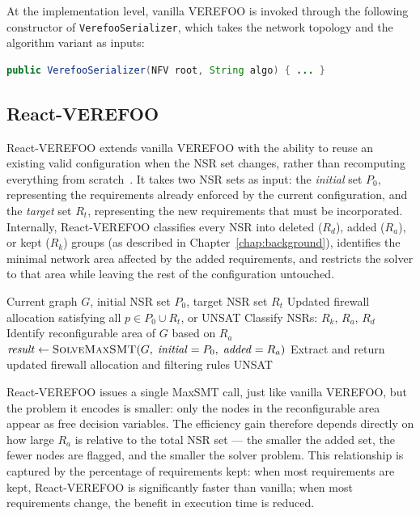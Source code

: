 At the implementation level, vanilla VEREFOO is invoked through the following constructor of \texttt{VerefooSerializer}, which takes the network topology and the algorithm variant as inputs:

\begin{lstlisting}[language=Java, caption={Vanilla VEREFOO constructor.}, label={lst:vanilla-constructor}]
public VerefooSerializer(NFV root, String algo) { ... }
\end{lstlisting}

\subsection{React-VEREFOO}

React-VEREFOO extends vanilla VEREFOO with the ability to reuse an existing valid configuration when the NSR set changes, rather than recomputing everything from scratch~\cite{reactverefoo}. It takes two NSR sets as input: the \textit{initial} set $P_0$, representing the requirements already enforced by the current configuration, and the \textit{target} set $R_t$, representing the new requirements that must be incorporated. Internally, React-VEREFOO classifies every NSR into deleted ($R_d$), added ($R_a$), or kept ($R_k$) groups (as described in Chapter~\ref{chap:background}), identifies the minimal network area affected by the added requirements, and restricts the solver to that area while leaving the rest of the configuration untouched.

\begin{algorithm}[H]
\caption{React-VEREFOO}
\label{alg:react}
\begin{algorithmic}[1]
\Require Current graph $G$, initial NSR set $P_0$, target NSR set $R_t$
\Ensure Updated firewall allocation satisfying all $p \in P_0 \cup R_t$, or UNSAT
\State Classify NSRs: $R_k$, $R_a$, $R_d$ 
\State Identify reconfigurable area of $G$ based on $R_a$
\State $\mathit{result} \gets \textsc{SolveMaxSMT}(G,\; \mathit{initial} = P_0,\; \mathit{added} = R_a)$
    \State Extract and return updated firewall allocation and filtering rules
\Else
    \State \Return UNSAT
\EndIf
\end{algorithmic}
\end{algorithm}

React-VEREFOO issues a single MaxSMT call, just like vanilla VEREFOO, but the problem it encodes is smaller: only the nodes in the reconfigurable area appear as free decision variables. The efficiency gain therefore depends directly on how large $R_a$ is relative to the total NSR set — the smaller the added set, the fewer nodes are flagged, and the smaller the solver problem. This relationship is captured by the percentage of requirements kept: when most requirements are kept, React-VEREFOO is significantly faster than vanilla; when most requirements change, the benefit in execution time is reduced.

